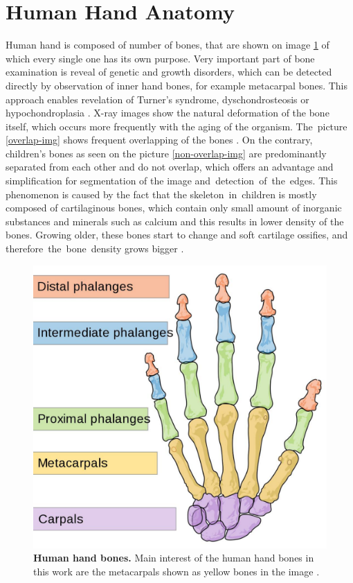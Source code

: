 \section{Human Hand Anatomy}
Human hand is composed of number of bones, that are shown on image \ref{bones} of which every single one has its own purpose. Very important part of bone examination is reveal of genetic and growth disorders, which can be detected directly by observation of inner hand bones, for example metacarpal bones. This approach enables revelation of Turner's syndrome, dyschondrosteosis or hypochondroplasia \cite{diseases}. X-ray images show the natural deformation of the bone itself, which occurs more frequently with the aging of the organism. The~picture \ref{overlap-img} shows frequent overlapping of the bones \cite{bones-deformation}. On the contrary, children's bones as seen on the picture \ref{non-overlap-img} are predominantly separated from each other and do not overlap, which offers an advantage and simplification for segmentation of the image and~detection~of~the~edges. This phenomenon is caused by the fact that the skeleton~in~children is mostly composed of cartilaginous bones, which contain only small amount of inorganic substances and minerals such as calcium and this results in lower density of the bones. Growing older, these bones start to change and soft cartilage ossifies, and therefore~the~bone~density grows bigger \cite{aging-effect}.

\begin{figure}[!ht]
  \centering
  \includegraphics[width=.4\textwidth]{obrazky-figures/human_hand.pdf}
  \caption{\textbf{Human hand bones.} Main interest of the human hand bones in this work are the metacarpals shown as yellow bones in the image \cite{human-hand}.}
  \label{bones}
\end{figure}

